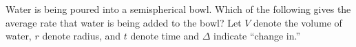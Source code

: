 \documentclass{ximera}
\begin{document}
\begin{problem}
  Water is being poured into a semispherical bowl.  Which of the
  following gives the average rate that water is being added to the
  bowl?  Let $V$ denote the volume of water, $r$ denote radius, and
  $t$ denote time and $\Delta$ indicate ``change in.''
  \begin{multipleChoice}
  \end{multipleChoice}
\end{problem}
\end{document}
